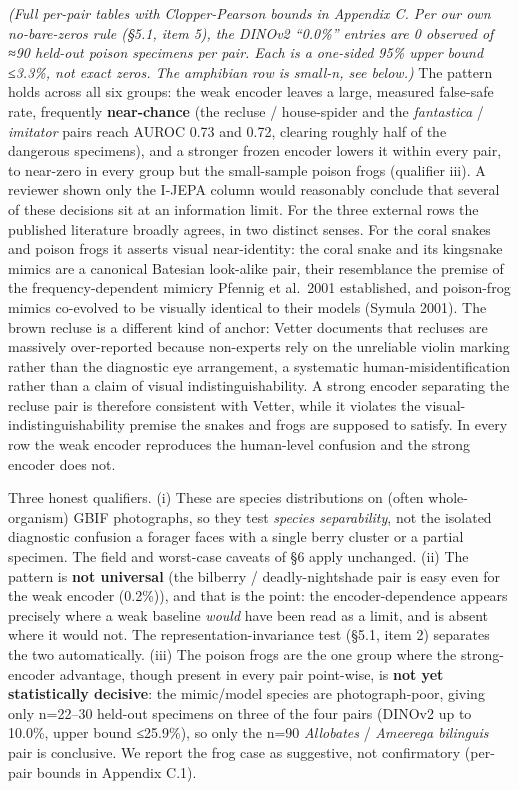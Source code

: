 \emph{(Full per-pair tables with Clopper-Pearson bounds in Appendix C.
Per our own no-bare-zeros rule (§5.1, item 5), the DINOv2 ``0.0\%''
entries are 0 observed of ≈90 held-out poison specimens per pair. Each
is a one-sided 95\% upper bound ≤3.3\%, not exact zeros. The amphibian
row is small-n, see below.)} The pattern holds across all six groups:
the weak encoder leaves a large, measured false-safe rate, frequently
\textbf{near-chance} (the recluse / house-spider and the
\emph{fantastica} / \emph{imitator} pairs reach AUROC 0.73 and 0.72,
clearing roughly half of the dangerous specimens), and a stronger frozen
encoder lowers it within every pair, to near-zero in every group but the
small-sample poison frogs (qualifier iii). A reviewer shown only the
I-JEPA column would reasonably conclude that several of these decisions
sit at an information limit. For the three external rows the published
literature broadly agrees, in two distinct senses. For the coral snakes
and poison frogs it asserts visual near-identity: the coral snake and
its kingsnake mimics are a canonical Batesian look-alike pair, their
resemblance the premise of the frequency-dependent mimicry Pfennig et
al.~2001 established, and poison-frog mimics co-evolved to be visually
identical to their models (Symula 2001). The brown recluse is a
different kind of anchor: Vetter documents that recluses are massively
over-reported because non-experts rely on the unreliable violin marking
rather than the diagnostic eye arrangement, a systematic
human-misidentification rather than a claim of visual
indistinguishability. A strong encoder separating the recluse pair is
therefore consistent with Vetter, while it violates the
visual-indistinguishability premise the snakes and frogs are supposed to
satisfy. In every row the weak encoder reproduces the human-level
confusion and the strong encoder does not.

Three honest qualifiers. (i) These are species distributions on (often
whole-organism) GBIF photographs, so they test \emph{species
separability}, not the isolated diagnostic confusion a forager faces
with a single berry cluster or a partial specimen. The field and
worst-case caveats of §6 apply unchanged. (ii) The pattern is
\textbf{not universal} (the bilberry / deadly-nightshade pair is easy
even for the weak encoder (0.2\%)), and that is the point: the
encoder-dependence appears precisely where a weak baseline \emph{would}
have been read as a limit, and is absent where it would not. The
representation-invariance test (§5.1, item 2) separates the two
automatically. (iii) The poison frogs are the one group where the
strong-encoder advantage, though present in every pair point-wise, is
\textbf{not yet statistically decisive}: the mimic/model species are
photograph-poor, giving only n=22--30 held-out specimens on three of the
four pairs (DINOv2 up to 10.0\%, upper bound ≤25.9\%), so only the n=90
\emph{Allobates} / \emph{Ameerega bilinguis} pair is conclusive. We
report the frog case as suggestive, not confirmatory (per-pair bounds in
Appendix C.1).

